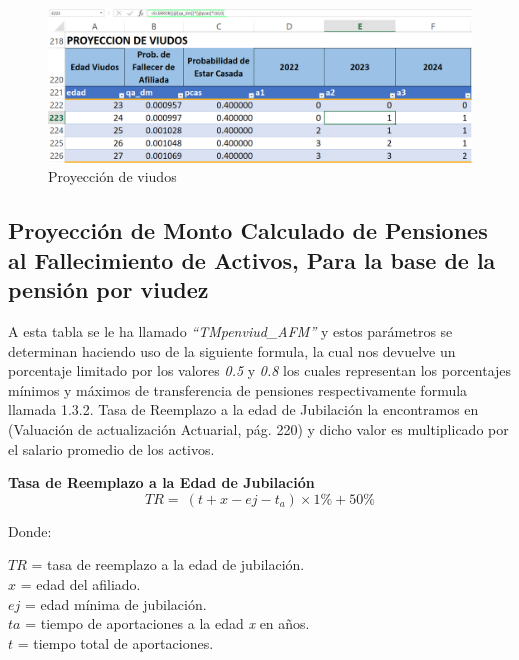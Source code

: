 \documentclass[
  letterpaper,
  DIV=11,
  numbers=noendperiod]{scrreprt}
\begin{document}
\begin{figure}

{\centering \includegraphics{images/F/Img17.png}

}

\caption{Proyección de viudos}

\end{figure}

\hypertarget{proyecciuxf3n-de-monto-calculado-de-pensiones-al-fallecimiento-de-activos-para-la-base-de-la-pensiuxf3n-por-viudez}{%
\subsection{Proyección de Monto Calculado de Pensiones al Fallecimiento
de Activos, Para la base de la pensión por
viudez}\label{proyecciuxf3n-de-monto-calculado-de-pensiones-al-fallecimiento-de-activos-para-la-base-de-la-pensiuxf3n-por-viudez}}

A esta tabla se le ha llamado \emph{``TMpenviud\_AFM''} y estos
parámetros se determinan haciendo uso de la siguiente formula, la cual
nos devuelve un porcentaje limitado por los valores \emph{0.5} y
\emph{0.8} los cuales representan los porcentajes mínimos y máximos de
transferencia de pensiones respectivamente formula llamada 1.3.2. Tasa
de Reemplazo a la edad de Jubilación la encontramos en (Valuación de
actualización Actuarial, pág. 220) y dicho valor es multiplicado por el
salario promedio de los activos.

\textbf{Tasa de Reemplazo a la Edad de Jubilación} \begin{equation}
TR=\ \left(t+x-ej-t_a\right)\times 1\%+50\%
\end{equation}

Donde:

\(TR\) = tasa de reemplazo a la edad de jubilación.\\
\(x\) = edad del afiliado.\\
\(ej\) = edad mínima de jubilación.\\
\(ta\) = tiempo de aportaciones a la edad \emph{x} en años.\\
\(t\) = tiempo total de aportaciones.
\end{document}
